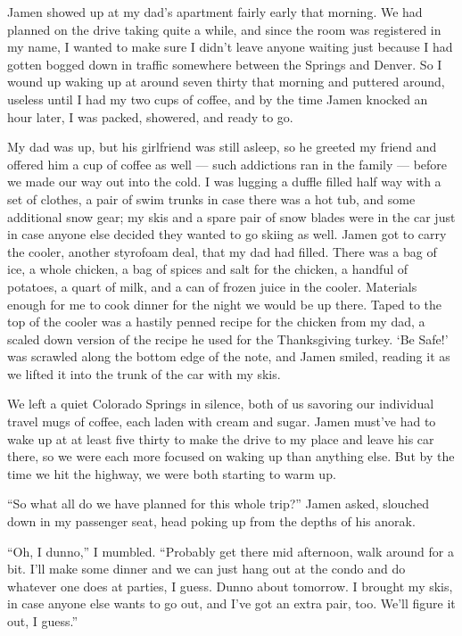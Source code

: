 Jamen showed up at my dad's apartment fairly early that morning.  We had planned on the drive taking quite a while, and since the room was registered in my name, I wanted to make sure I didn't leave anyone waiting just because I had gotten bogged down in traffic somewhere between the Springs and Denver.  So I wound up waking up at around seven thirty that morning and puttered around, useless until I had my two cups of coffee, and by the time Jamen knocked an hour later, I was packed, showered, and ready to go.

My dad was up, but his girlfriend was still asleep, so he greeted my friend and offered him a cup of coffee as well --- such addictions ran in the family --- before we made our way out into the cold.  I was lugging a duffle filled half way with a set of clothes, a pair of swim trunks in case there was a hot tub, and some additional snow gear; my skis and a spare pair of snow blades were in the car just in case anyone else decided they wanted to go skiing as well.  Jamen got to carry the cooler, another styrofoam deal, that my dad had filled.  There was a bag of ice, a whole chicken, a bag of spices and salt for the chicken, a handful of potatoes, a quart of milk, and a can of frozen juice in the cooler.  Materials enough for me to cook dinner for the night we would be up there.  Taped to the top of the cooler was a hastily penned recipe for the chicken from my dad, a scaled down version of the recipe he used for the Thanksgiving turkey.  `Be Safe!' was scrawled along the bottom edge of the note, and Jamen smiled, reading it as we lifted it into the trunk of the car with my skis.

We left a quiet Colorado Springs in silence, both of us savoring our individual travel mugs of coffee, each laden with cream and sugar.  Jamen must've had to wake up at at least five thirty to make the drive to my place and leave his car there, so we were each more focused on waking up than anything else.  But by the time we hit the highway, we were both starting to warm up.

``So what all do we have planned for this whole trip?''  Jamen asked, slouched down in my passenger seat, head poking up from the depths of his anorak.

``Oh, I dunno,'' I mumbled.  ``Probably get there mid afternoon, walk around for a bit.  I'll make some dinner and we can just hang out at the condo and do whatever one does at parties, I guess.  Dunno about tomorrow.  I brought my skis, in case anyone else wants to go out, and I've got an extra pair, too.  We'll figure it out, I guess.''

